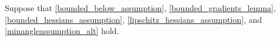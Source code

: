 Suppose that \cref{bounded_below_assumption}, \cref{bounded_gradients_lemma}, \cref{bounded_hessians_assumption}, \cref{lipschitz_hessians_assumption}, and \cref{minangleassumption_alt} hold.
